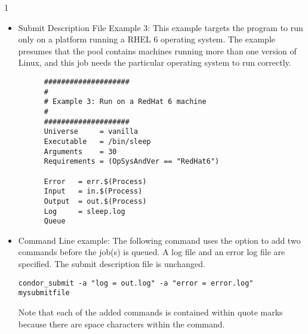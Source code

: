 \begin{ManPage}{\label{man-condor-submit}}{1}
\begin{itemize}
\begin{verbatim}
      Executable     = foo                                                    
      Universe       = standard
      Requirements   = OpSys == "LINUX" && Arch =="INTEL"
      Rank           = Memory >= 64
      Request_Memory = 32 Mb
      Image_Size     = 28 Mb
                                                                          
      Error   = err.$(Process)                                                
      Input   = in.$(Process)                                                 
      Output  = out.$(Process)                                                
      Log = foo.log                                                                       
      Queue 150
\end{verbatim}
\normalsize

\item{Submit Description File Example 3:}  This example targets the 
 program to run only on a platform running a 
RHEL 6 operating system.
The example presumes that the pool contains machines running more than one
version of Linux, 
and this job needs the particular operating system to run correctly.

\footnotesize
\begin{verbatim}
      ####################                                                    
      #                                                                       
      # Example 3: Run on a RedHat 6 machine
      #                                                                       
      ####################                                                    
      Universe     = vanilla
      Executable   = /bin/sleep
      Arguments    = 30
      Requirements = (OpSysAndVer == "RedHat6")
                                                                          
      Error   = err.$(Process)                                                
      Input   = in.$(Process)                                                 
      Output  = out.$(Process)                                                
      Log     = sleep.log                                                                       
      Queue
\end{verbatim}
\normalsize



\item{Command Line example:} The following command uses the
 option to add two commands before the job(s) is queued.
A log file and an error log file are specified.
The submit description file is unchanged.
\footnotesize
\begin{verbatim}
condor_submit -a "log = out.log" -a "error = error.log" mysubmitfile
\end{verbatim}
\normalsize
Note that each of the added commands is contained within quote marks
because there are space characters within the command.


\end{itemize}
\end{ManPage}
